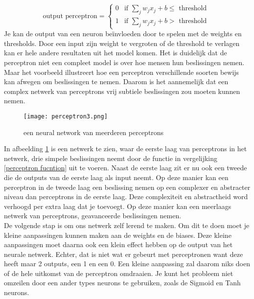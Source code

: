 \begin{equation*}
\text{output perceptron}= \begin{cases}
0 &\text{if $\sum_{j}w_{j}x_{j}+ b \leq $ threshold }\\
1 &\text{if $\sum_{j}w_{j}x_{j}+ b>$ threshold }
\end{cases} 
\label{perceptron functie}
\end{equation*}
\newline
\noindent Je kan de output van een neuron beïnvloeden door te spelen met de weights en thresholds. Door een input zijn weight te vergroten of de threshold te verlagen kan er hele andere resultaten uit het model komen\cite{NeuralNetwork1}.
\newpage
\noindent Het is duidelijk dat de perceptron niet een compleet model is over hoe mensen hun beslissingen nemen. Maar het voorbeeld illustreert hoe een perceptron verschillende soorten bewijs kan afwegen om beslissingen te nemen. Daarom is het aannemelijk dat een complex netwerk van perceptrons vrij subtiele beslissingen zou moeten kunnen nemen\cite{NeuralNetwork1}.
\begin{figure}[h!]
\centering
\texttt{[image: perceptron3.png]}
\caption{een neural network van meerderen perceptrons}
\label{perceptron3}
\end{figure}
\newline
In afbeelding \ref{perceptron3} is een netwerk te zien, waar de eerste laag van perceptrons in het netwerk, drie simpele beslissingen neemt door de functie in vergelijking \ref{perceptron fucntion} uit te voeren. Naast de eerste laag zit er nu ook een tweede die de outputs van de eerste laag als input neemt. Op deze manier kan een perceptron in de tweede laag een beslissing nemen op een complexer en abstracter niveau dan perceptrons in de eerste laag. Deze complexiteit en abstractheid word verhoogd per extra laag dat je toevoegt. Op deze manier kan een meerlaags netwerk van perceptrons, geavanceerde beslissingen nemen\cite{NeuralNetwork1}\cite{learning}.\\
\newline
De volgende stap is om ons netwerk zelf lerend te maken. Om dit te doen moet je kleine aanpassingen kunnen maken aan de weights en de biases. Deze kleine aanpassingen moet daarna ook een klein effect hebben op de output van het neurale netwerk. Echter, dat is niet wat er gebeurt met perceptronen want deze heeft maar 2 outputs, een 1 en een 0. Een kleine aanpassing zal daarom niks doen of de hele uitkomst van de perceptron omdraaien. Je kunt  het probleem niet omzeilen door een ander types neurons te gebruiken, zoals de Sigmoid en Tanh neurons.\cite{learning}
\pagebreak
